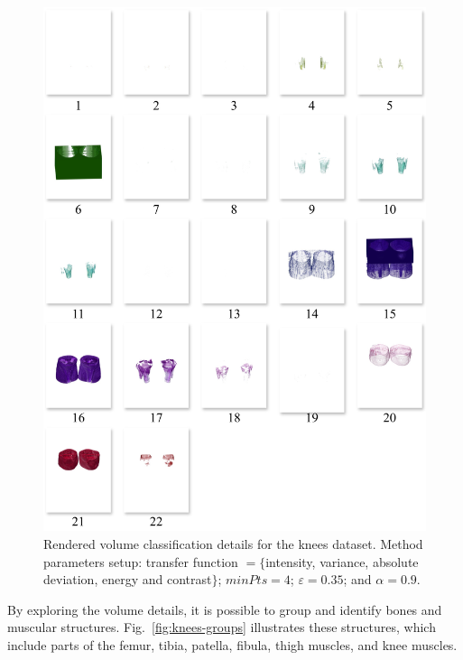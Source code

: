 \begin{figure}[htb!]
    \centering
    \includegraphics[width=\columnwidth]{figs/knees-clusters.jpg} 
     \caption{Rendered volume classification details for the knees dataset. Method parameters setup: transfer function $=\{$intensity,  variance, absolute deviation, energy and contrast$\}$; $minPts = 4$; $\varepsilon = 0.35$; and $\alpha = 0.9$.}
    \label{fig:knees-clusters}
\end{figure}


By exploring the volume details, it is possible to group and identify bones and muscular structures. Fig.~\ref{fig:knees-groups} illustrates these structures, which include parts of the femur, tibia, patella, fibula, thigh muscles, and knee muscles.

